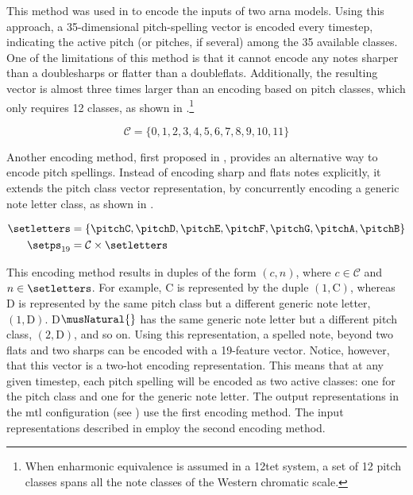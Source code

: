 This method was used in \textcite{micchi2020not,
micchi2021deep} to encode the inputs of two \gls{arna}
models. Using this approach, a 35-dimensional pitch-spelling
vector is encoded every timestep, indicating the active
pitch (or pitches, if several) among the 35 available
classes. One of the limitations of this method is that it
cannot encode any notes sharper than a \glspl{doublesharp}
or flatter than a \glspl{doubleflat}. Additionally, the
resulting vector is almost three times larger than an
encoding based on pitch classes, which only requires 12
classes, as shown in .\footnote{When
enharmonic equivalence is assumed in a \gls{12tet} system, a
set of 12 pitch classes spans all the note classes of the
Western chromatic scale.}

\begin{equation}
    \label{eq:pitch_classes}
    \mathcal{C} = \{0, 1, 2, 3, 4, 5, 6, 7, 8, 9, 10, 11\}
\end{equation}



Another encoding method, first proposed in
\textcite{napoleslopez2021augmentednet}, provides an
alternative way to encode pitch spellings. Instead of
encoding \gls{sharp} and \glspl{flat} notes explicitly, it
extends the pitch class vector representation, by
concurrently encoding a generic note letter class, as shown
in .

\begin{equation}
    \label{eq:pitch_spelling_19}
    \begin{split}
        \setletters &= \{ \pitchC, \pitchD, \pitchE, \pitchF, \pitchG, \pitchA, \pitchB \} \\ 
        \setps_{19} &= \mathcal{C}
        \times \setletters
    \end{split}
\end{equation}


This encoding method results in duples of the form $(c, n)$,
where $c \in \mathcal{C}$ and $n \in \setletters$. For
example, C\musSharp{} is represented by the duple $(1,
\text{C})$, whereas D\musFlat{} is represented by the same
pitch class but a different generic note letter, $(1,
\text{D})$. D$\musNatural{}$ has the same generic note
letter but a different pitch class, $(2, \text{D})$, and so
on. Using this representation, a spelled note, beyond two
flats and two sharps can be encoded with a 19-feature
vector. Notice, however, that this vector is a two-hot
encoding representation. This means that at any given
timestep, each pitch spelling will be encoded as two active
classes: one for the pitch class and one for the generic
note letter. The output representations in the \gls{mtl}
configuration (see ) use
the first encoding method. The input representations
described in  employ the
second encoding method. 
